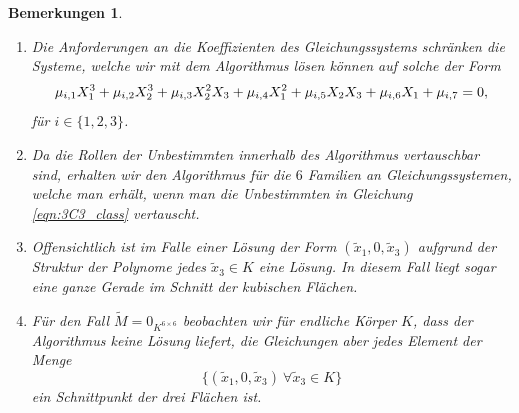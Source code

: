 \documentclass[a4paper,oneside, 11pt, openany%
]{article}
\theoremstyle{custom}
\theoremstyle{custom}
\newtheorem{remarks}[theorem]{Bemerkungen}
\begin{document}
	
	\begin{remarks}~
		\begin{enumerate}
			\item Die Anforderungen an die Koeffizienten des Gleichungssystems schränken die Systeme, welche wir mit dem Algorithmus lösen können auf solche der Form
			\begin{equation}\label{eqn:3C3_class}
				\small
					\mu_{i,1}X_{1}^3+\mu_{i,2}X_{2}^3+\mu_{i,3}X_{2}^2X_{3}+\mu_{i,4}X_{1}^2+\mu_{i,5}X_{2}X_{3}+\mu_{i,6}X_{1}+\mu_{i,7} = 0,
			\end{equation}
			für $i \in \{1,2,3\}$.
			\item Da die Rollen der Unbestimmten innerhalb des Algorithmus vertauschbar sind, erhalten wir den Algorithmus für die $6$ Familien an Gleichungssystemen, welche man erhält, wenn man die Unbestimmten in Gleichung \eqref{eqn:3C3_class} vertauscht.
			\item Offensichtlich ist im Falle einer Lösung der Form $(\tilde{x}_1,0,\tilde{x}_3)$ aufgrund der Struktur der Polynome jedes $\tilde{x}_3 \in K$ eine Lösung. In diesem Fall liegt sogar eine ganze Gerade im Schnitt der kubischen Flächen.
			\item Für den Fall $\tilde{M}=0_{K^{6 \times 6}}$ beobachten wir für endliche Körper $K$, dass der Algorithmus keine Lösung liefert, die Gleichungen aber jedes Element der Menge
			\begin{equation}
				\{(\tilde{x}_1,0,\tilde{x}_3) \ \forall \tilde{x}_3 \in K\}
			\end{equation}
			ein Schnittpunkt der drei Flächen ist.
		\end{enumerate}
	\end{remarks}
	\newpage
\end{document}
